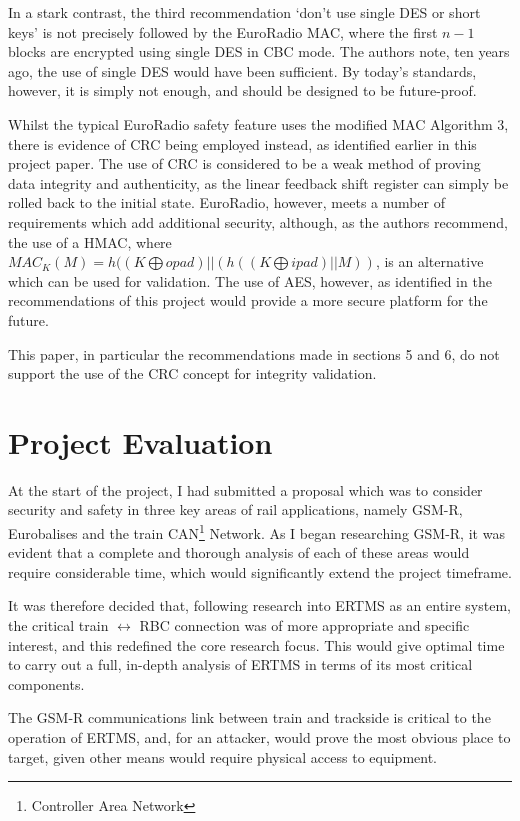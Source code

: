 \documentclass[twoside,11pt,a4paper]{article}
\begin{document}
In a stark contrast, the third recommendation `don't use single DES or short keys' is not precisely followed by the EuroRadio MAC, where the first $n - 1$ blocks are encrypted using single DES in CBC mode. The authors note, ten years ago, the use of single DES would have been sufficient. By today's standards, however, it is simply not enough, and should be designed to be future-proof.

Whilst the typical EuroRadio safety feature uses the modified MAC Algorithm 3, there is evidence of CRC being employed instead, as identified earlier in this project paper. The use of CRC is considered to be a weak method of proving data integrity and authenticity, as the linear feedback shift register can simply be rolled back to the initial state. EuroRadio, however, meets a number of requirements which add additional security, although, as the authors recommend, the use of a HMAC, where $MAC_K(M) = h((K \bigoplus opad) || (h((K \bigoplus ipad) || M))$, is an alternative which can be used for validation. The use of AES, however, as identified in the recommendations of this project would provide a more secure platform for the future.

This paper, in particular the recommendations made in sections 5 and 6, do not support the use of the CRC concept for integrity validation.


\clearpage
\section{Project Evaluation}
At the start of the project, I had submitted a proposal which was to consider security and safety in three key areas of rail applications, namely GSM-R, Eurobalises and the train CAN\footnote{Controller Area Network} Network. As I began researching GSM-R, it was evident that a complete and thorough analysis of each of these areas would require considerable time, which would significantly extend the project timeframe.

It was therefore decided that, following research into ERTMS as an entire system, the critical train $\leftrightarrow$ RBC connection was of more appropriate and specific interest, and this redefined the core research focus. This would give optimal time to carry out a full, in-depth analysis of ERTMS in terms of its most critical components.

The GSM-R communications link between train and trackside is critical to the operation of ERTMS, and, for an attacker, would prove the most obvious place to target, given other means would require physical access to equipment.
\end{document}
